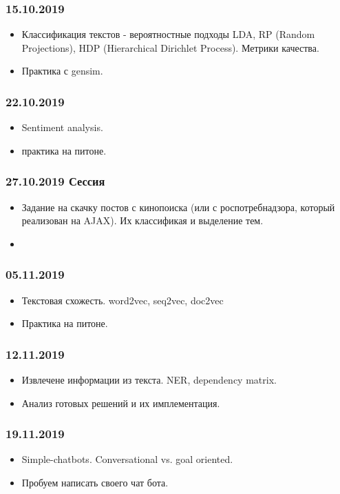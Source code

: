 \documentclass[a4paper,11pt]{article}
\begin{document}
\subsubsection{15.10.2019}
\begin{itemize}
	\item Классификация текстов - вероятностные подходы LDA, RP (Random Projections), HDP (Hierarchical Dirichlet Process). Метрики качества. 
	\item Практика с gensim. 
\end{itemize}
\subsubsection{22.10.2019}
\begin{itemize}
	\item Sentiment analysis.
	\item практика на питоне. 
\end{itemize}
\subsubsection{27.10.2019 Сессия}
\begin{itemize}
	\item  Задание на скачку постов с кинопоиска (или с роспотребнадзора, который реализован на AJAX). Их классификая и выделение тем. 
	\item 
\end{itemize}
\subsubsection{05.11.2019}
\begin{itemize}
	\item Текстовая схожесть. word2vec, seq2vec, doc2vec
	\item Практика на питоне. 
\end{itemize}
\subsubsection{12.11.2019}
\begin{itemize}
	\item Извлечене информации из текста. NER, dependency matrix.
	\item Анализ готовых решений и их имплементация. 
\end{itemize}
\subsubsection{19.11.2019}
\begin{itemize}
	\item Simple-chatbots. Conversational vs. goal oriented.
	\item Пробуем написать своего чат бота.
\end{itemize}
\end{document}
